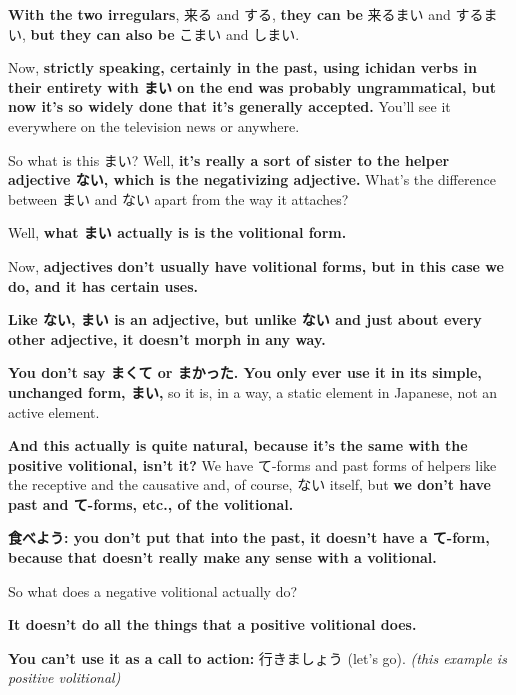 {\bf With the two irregulars}, 来る and する, {\bf they can be} 来るまい and するまい, {\bf but they can also be} こまい and しまい.

\thinrule

Now, {\bf strictly speaking, certainly in the past, using ichidan verbs in their entirety with まい on the end was probably ungrammatical, but now it's so widely done that it's generally accepted.} You'll see it everywhere on the television news or anywhere.

\thinrule

So what is this まい? Well, {\bf it's really a sort of sister to the helper adjective ない, which is the negativizing adjective.} What's the difference between まい and ない apart from the way it attaches?

Well, {\bf what まい actually is is the volitional form.}

{}

Now, {\bf adjectives don't usually have volitional forms, but in this case we do, and it has certain uses.}

\thinrule

{\bf Like ない, まい is an adjective, but unlike ない and just about every other adjective, it doesn't morph in any way.}

{\bf You don't say まくて or まかった. You only ever use it in its simple, unchanged form, まい,} so it is, in a way, a static element in Japanese, not an active element.

{\bf And this actually is quite natural, because it's the same with the positive volitional, isn't it?} We have て-forms and past forms of helpers like the receptive and the causative and, of course, ない itself, but {\bf we don't have past and て-forms, etc., of the volitional.}

{\bf 食べよう: you don't put that into the past, it doesn't have a て-form, because that doesn't really make any sense with a volitional.}

\stopsectionlevel

\startsectionlevel[title={What a negative volitional cannot do},reference={what-a-negative-volitional-cannot-do}]

So what does a negative volitional actually do?

{\bf It doesn't do all the things that a positive volitional does.}

{\bf You can't use it as a call to action:} 行きましょう (let's go). {\em (this example is positive volitional)}

